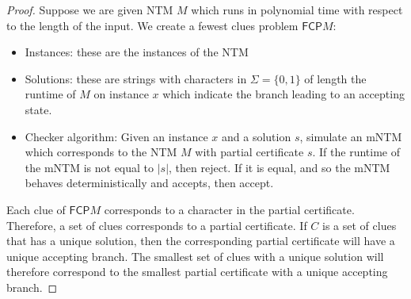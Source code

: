 \documentclass[runningheads,a4paper]{llncs}
\begin{document}
\begin{proof}
Suppose we are given NTM $M$ which runs in polynomial time with respect to the length of the input. We create a fewest clues problem $\mathsf{FCP} M$:
\begin{itemize}
\item Instances: these are the instances of the NTM
\item Solutions: these are strings with characters in $\Sigma = \{ 0, 1 \}$ of length the runtime of $M$ on instance $x$ which indicate the branch leading to an accepting state.
\item Checker algorithm: Given an instance $x$ and a solution $s$, simulate an mNTM which corresponds to the NTM $M$ with partial certificate $s$. If the runtime of the mNTM is not equal to $|s|$, then reject. If it is equal, and so the mNTM behaves deterministically and accepts, then accept. 
\end{itemize}
Each clue of $\mathsf{FCP} M$ corresponds to a character in the partial certificate. Therefore, a set of clues corresponds to a partial certificate. If $C$ is a set of clues that has a unique solution, then the corresponding partial certificate will have a unique accepting branch. The smallest set of clues with a unique solution will therefore correspond to the smallest partial certificate with a unique accepting branch.

\end{proof}
\end{document}
